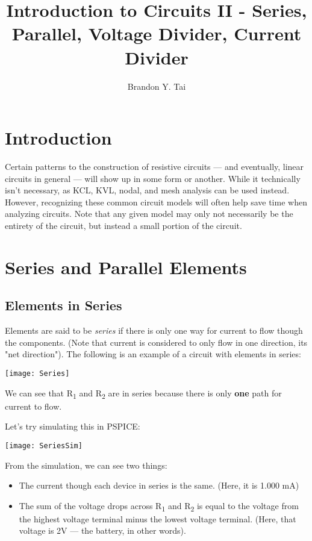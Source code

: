 \documentclass[12pt,letterpaper]{article}
\begin{document}
\title{Introduction to Circuits II - Series, Parallel, Voltage Divider, Current Divider}
\author{Brandon Y. Tai}
\maketitle

\setcounter{section}{-1}

\section{Introduction}
	Certain patterns to the construction of resistive circuits --- and eventually, linear circuits in general --- will show up in some form or another. While it technically isn't necessary, as KCL, KVL, nodal, and mesh analysis can be used instead. However, recognizing these common circuit models will often help save time when analyzing circuits. Note that any given model may only not necessarily be the entirety of the circuit, but instead a small portion of the circuit.

\section{Series and Parallel Elements}

\subsection{Elements in Series}
Elements are said to be \textit{series} if there is only one way for current to flow though the components. (Note that current is considered to only flow in one direction, its "net direction"). The following is an example of a circuit with elements in series:

\begin{center}
\texttt{[image: Series]}
\end{center}

We can see that R\textsubscript{1} and R\textsubscript{2} are in series because there is only \textbf{one} path for current to flow. \par

Let's try simulating this in PSPICE:

\begin{center}
\texttt{[image: SeriesSim]}
\end{center}

From the simulation, we can see two things: \\ 
\begin{itemize}
\item The current though each device in series is the same. (Here, it is 1.000 mA)
\item The sum of the voltage drops across R\textsubscript{1} and R\textsubscript{2} is equal to the voltage from the highest voltage terminal minus the lowest voltage terminal. (Here, that voltage is 2V --- the battery, in other words).
\end{itemize}
\end{document}
